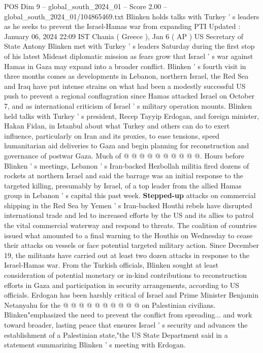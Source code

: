 \begin{textsample}{POS Dim 9 – global\_south\_2024\_01 – Score 2.00 – global\_south\_2024\_01/104865469.txt}  \label{ex:f9_pos_019}
Blinken holds talks with Turkey ' s leaders as he seeks to prevent the Israel-Hamas war from expanding PTI Updated : January 06, 2024 22:09 IST Chania ( Greece ), Jan 6 ( AP ) US Secretary of State Antony Blinken met with Turkey ' s leaders Saturday during the first stop of his latest Mideast diplomatic mission as fears grow that Israel ' s war against Hamas in Gaza may expand into a broader conflict.
Blinken ' s fourth visit in three months comes as developments in Lebanon, northern Israel, the Red Sea and Iraq have put intense strains on what had been a modestly successful US push to prevent a regional conflagration since Hamas attacked Israel on October 7, and as international criticism of Israel ' s military operation mounts.
Blinken held talks with Turkey ' s president, Recep Tayyip Erdogan, and foreign minister, Hakan Fidan, in Istanbul about what Turkey and others can do to exert influence, particularly on Iran and its proxies, to ease tensions, speed humanitarian aid deliveries to Gaza and begin planning for reconstruction and governance of postwar Gaza.
Much of @ @ @ @ @ @ @ @ @ @.
Hours before Blinken ' s meetings, Lebanon ' s Iran-backed Hezbollah militia fired dozens of rockets at northern Israel and said the barrage was an initial response to the targeted killing, presumably by Israel, of a top leader from the allied Hamas group in Lebanon ' s capital this past week. \textbf{Stepped-up} attacks on commercial shipping in the Red Sea by Yemen ' s Iran-backed Houthi rebels have disrupted international trade and led to increased efforts by the US and its allies to patrol the vital commercial waterway and respond to threats.
The coalition of countries issued what amounted to a final warning to the Houthis on Wednesday to cease their attacks on vessels or face potential targeted military action.
Since December 19, the militants have carried out at least two dozen attacks in response to the Israel-Hamas war.
From the Turkish officials, Blinken sought at least consideration of potential monetary or in-kind contributions to reconstruction efforts in Gaza and participation in security arrangements, according to US officials.
Erdogan has been harshly critical of Israel and Prime Minister Benjamin Netanyahu for the @ @ @ @ @ @ @ @ @ @ on Palestinian civilians.
Blinken"emphasized the need to prevent the conflict from spreading... and work toward broader, lasting peace that ensures Israel ' s security and advances the establishment of a Palestinian state,"the US State Department said in a statement summarizing Blinken ' s meeting with Erdogan.

\end{textsample}

